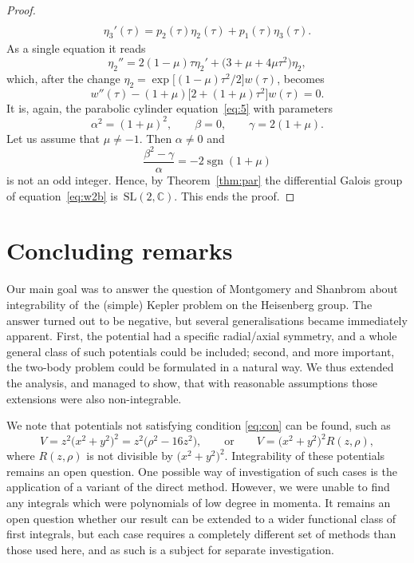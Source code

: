 \documentclass[11pt]{article}
\numberwithin{equation}{section}
\DeclareMathOperator{\sgn}{sgn}
\numberwithin{equation}{section}
\begin{document}
\begin{proof}
\begin{gather*}
 \\
 \eta_3'(\tau) = p_2(\tau) \eta_2(\tau) + p_1(\tau)\eta_3(\tau).
 \end{gather*}
 As a single equation it reads
 \begin{equation*}
 \eta_2'' = 2(1-\mu)\tau \eta_2' + \big(3+\mu+4\mu \tau^2\big)\eta_2,
 \end{equation*}
 which, after the change $\eta_2=\exp\big[(1-\mu)\tau^2/2\big]w(\tau)$, becomes
 \begin{equation}
 \label{eq:w2b}
 w''(\tau) -(1+\mu)\big[2 +(1+\mu)\tau^2\big]w(\tau)=0.
 \end{equation}
 It is, again, the parabolic cylinder equation~\eqref{eq:5} with parameters
 \begin{equation*}
 \alpha^2= (1+\mu)^2, \qquad
 \beta=0, \qquad
 \gamma = 2(1+\mu).
 \end{equation*}
 Let us assume that $\mu\neq-1$. Then $\alpha\neq 0$ and
 \[
 \frac{\beta^2-\gamma}{\alpha}=-2\sgn(1+\mu)
 \]
 is not an odd integer. Hence, by Theorem~\ref{thm:par} the
 differential Galois group of equation~\eqref{eq:w2b} is~$\mathrm{SL}(2,\mathbb{C})$. This ends the proof.
\end{proof}


\section{Concluding remarks}

Our main goal was to answer the question of Montgomery and Shanbrom about integrability of~the (simple) Kepler problem on the Heisenberg group. The answer turned out to be negative, but several generalisations became immediately apparent. First, the potential had a specific radial/axial symmetry, and a whole general class of such potentials could be included; second, and more important, the two-body problem could be formulated in a natural way. We thus extended the analysis, and managed to show, that with reasonable assumptions those extensions were also non-integrable.

We note that potentials not satisfying condition \eqref{eq:con} can be found, such as
\begin{equation*}
 V = z^2\big(x^2+y^2\big)^2 = z^2\big(\rho^2-16z^2\big), \qquad\text{or}\qquad V=\big(x^2+y^2\big)^2R(z,\rho),
\end{equation*}
where $R(z,\rho)$ is not divisible by $\big(x^2+y^2\big)^2$. Integrability of these potentials remains an open question.
One possible way of investigation of such cases is the application of a variant of the direct method. However, we were unable to find any integrals which were polynomials of low degree in momenta. It remains an open question whether our result can be extended to a wider functional class of first integrals, but each case requires a completely different set of methods than those used here, and as such is a subject for separate investigation.
\end{document}
